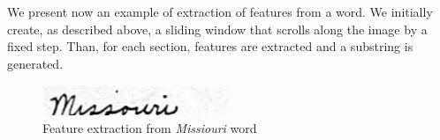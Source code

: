 We present now an example of extraction of features from a word. We initially create, as described above, a sliding window that scrolls along the image by a fixed step. Than, for each section,  features are extracted and a substring is generated.

\begin{figure}[!ht]
\centering
\includegraphics[width=0.5\textwidth]{images/missiouri/missiouri.jpg}
\caption{Feature extraction from \emph{Missiouri} word}
\label{fig:ap}
\end{figure} 

\begin{figure}[!ht]
 \centering

\end{figure}
